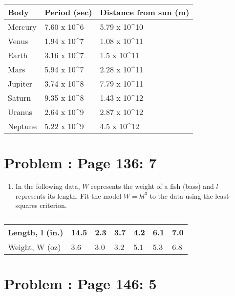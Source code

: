 \documentclass[]{article}
\providecommand{\tightlist}{%
  \setlength{\itemsep}{0pt}\setlength{\parskip}{0pt}}
\begin{document}
\begin{table}[!htbp]
\centering
\label{my-label}
\begin{tabular}{|l|l|l|}
\hline
Body    & Period (sec)                & Distance from sun (m)        \\ \hline
Mercury & 7.60 x 10\textasciicircum 6 & 5.79 x 10\textasciicircum 10 \\ \hline
Venus   & 1.94 x 10\textasciicircum 7 & 1.08 x 10\textasciicircum 11 \\ \hline
Earth   & 3.16 x 10\textasciicircum 7 & 1.5 x 10\textasciicircum 11  \\ \hline
Mars    & 5.94 x 10\textasciicircum 7 & 2.28 x 10\textasciicircum 11 \\ \hline
Jupiter & 3.74 x 10\textasciicircum 8 & 7.79 x 10\textasciicircum 11 \\ \hline
Saturn  & 9.35 x 10\textasciicircum 8 & 1.43 x 10\textasciicircum 12 \\ \hline
Uranus  & 2.64 x 10\textasciicircum 9 & 2.87 x 10\textasciicircum 12 \\ \hline
Neptune & 5.22 x 10\textasciicircum 9 & 4.5 x 10\textasciicircum 12  \\ \hline
\end{tabular}
\end{table}

\section{Problem : Page 136: 7}\label{problem-page-136-7}

\begin{enumerate}
\def\labelenumi{\alph{enumi}.}
\tightlist
\item
  In the following data, \(W\) represents the weight of a fish (bass)
  and \(l\) represents its length. Fit the model \(W = kl^3\) to the
  data using the least-squares criterion.
\end{enumerate}

\begin{table}[!htbp]
\centering
\caption{}
\label{my-label}
\begin{tabular}{l|llllll}
Length, l (in.) & 14.5 & 2.3 & 3.7 & 4.2 & 6.1 & 7.0 \\ \hline
Weight, W (oz)  & 3.6  & 3.0 & 3.2 & 5.1 & 5.3 & 6.8  
\end{tabular}
\end{table}

\section{Problem : Page 146: 5}\label{problem-page-146-5}
\end{document}
